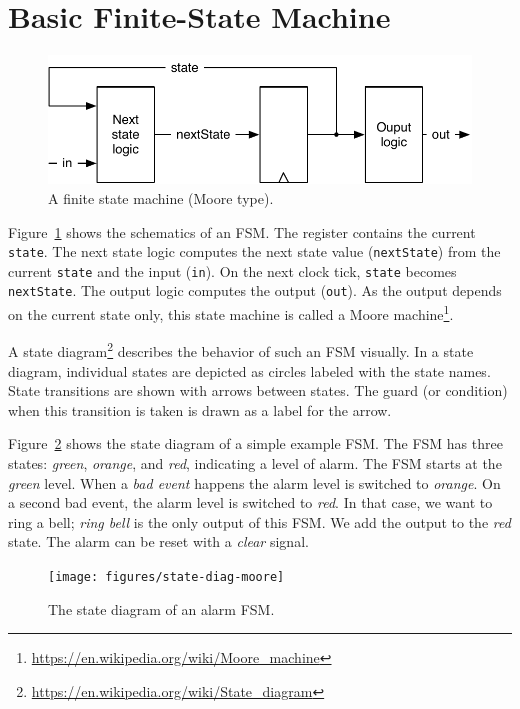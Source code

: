 \documentclass[%
    10pt,
    headinclude, footexclude,
    openright, %
    notitlepage,
    cleardoubleempty,
    headsepline,
    pointlessnumbers,
    bibtotoc, idxtotoc,
    ]{scrbook}
\newcommand{\code}[1]{{\small{\texttt{#1}}}}
\newcommand{\scale}{0.7}
\newcommand{\myref}[2]{\href{#1}{#2}}
\renewcommand{\myref}[2]{{#2}{\footnote{\url{#1}}}}
\begin{document}
\section{Basic Finite-State Machine}

\begin{figure}
  \centering
  \includegraphics[scale=\scale]{figures/fsm}
  \caption{A finite state machine (Moore type).}
  \label{fig:fsm}
\end{figure}

Figure~\ref{fig:fsm} shows the schematics of an FSM. The register contains the current \code{state}.
The next state logic computes the next state value (\code{nextState})
from the current \code{state} and the input (\code{in}).
On the next clock tick, \code{state} becomes \code{nextState}.
The output logic computes the output (\code{out}). As the output depends on the current
state only, this state machine is called a
\myref{https://en.wikipedia.org/wiki/Moore_machine}{Moore machine}.


A \myref{https://en.wikipedia.org/wiki/State_diagram}{state diagram}
describes the behavior of such an FSM visually.
In a state diagram, individual states are depicted as circles labeled
with the state names.
State transitions are shown with arrows between states.
The guard (or condition) when this transition is taken is drawn as a label
for the arrow.

Figure~\ref{fig:diag-moore} shows the state diagram of a simple example FSM.
The FSM has three states: \emph{green}, \emph{orange}, and \emph{red},
indicating a level of alarm. The FSM starts at the \emph{green} level.
When a \emph{bad event} happens the alarm level is switched to \emph{orange}.
On a second bad event, the alarm level is switched to \emph{red}.
In that case, we want to ring a bell; \emph{ring bell} is the only output of this FSM.
We add the output to the \emph{red} state.
The alarm can be reset with a \emph{clear} signal.

\begin{figure}
  \centering
  \texttt{[image: figures/state-diag-moore]}
  \caption{The state diagram of an alarm FSM.}
  \label{fig:diag-moore}
\end{figure}
\end{document}
